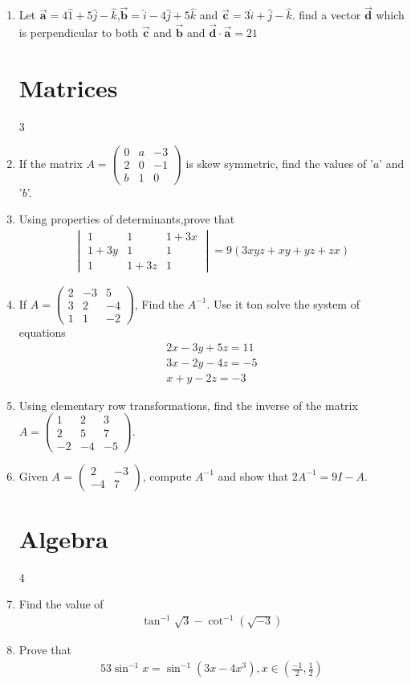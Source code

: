 \documentclass[10pt,-letter paper]{article}
\providecommand{\brak}[1]{\ensuremath{\left(#1\right)}}
\newcommand{\myvec}[1]{\ensuremath{\begin{pmatrix}#1\end{pmatrix}}}
\newcommand{\mydet}[1]{\ensuremath{\begin{vmatrix}#1\end{vmatrix}}}
\begin{document}
\begin{enumerate}
\item Let $\overrightarrow{\mathbf{a}}=4\hat{1}+5\hat{j}-\hat{k}$,$\overrightarrow{\mathbf{b}}=\hat{i}-4\hat{j}+5\hat{k}$ and $\overrightarrow{\mathbf{c}}=3\hat{i}+\hat{j}-\hat{k}$. find a vector $\overrightarrow{\mathbf{d}}$ which is perpendicular to both $\overrightarrow{\mathbf{c}}$ and $\overrightarrow{\mathbf{b}}$ and $\overrightarrow{\mathbf{d}}\cdot \overrightarrow{\mathbf{a}}=21$

\section{Matrices}

3 \item  If the matrix $A = \myvec{ 0 & a & -3 \\ 2 & 0 & -1 \\ b & 1 & 0 }$ is skew symmetric, find the values of '$a$' and '$b$'.

\item Using properties of determinants,prove that 
	\begin{align*}
		\mydet{1 & 1 & 1+3x \\ 1+3y & 1 & 1 \\ 1 & 1+3z & 1 }=9\brak{3xyz+xy+yz+zx}
	\end{align*}
\item If $A=\myvec{2 & -3 & 5 \\ 3 & 2 & -4 \\ 1 & 1 & -2}$, Find the $A^{-1}$. Use it ton solve the system of equations 
	\begin{align*}
		2x-3y+5z=11 \\
		3x-2y-4z=-5\\
		x+y-2z=-3
	\end{align*}
\item Using elementary row transformations, find the inverse of the matrix $A=\myvec{1 & 2 & 3 \\ 2 & 5 & 7 \\ -2 & -4 & -5}$.
\item Given $A$ = $\myvec{ 2 & -3 \\ -4 & 7 }$, compute $A^{-1}$ and show that $2A^{-1} = 9I-A$.
\section{Algebra}

4\item Find the value of
	\begin{align*}
		\tan^{-1}\sqrt{3}-\cot^{-1}\brak{\sqrt{-3}}
	\end{align*}
 \item Prove that 
			\begin{align*}
		5 3\sin^{-1}x=\sin^{-1}\brak{3x-4x^3}, x\in\brak{\frac{-1}{2},\frac{1}{2}}
			\end{align*} 

\end{enumerate}
\end{document}
